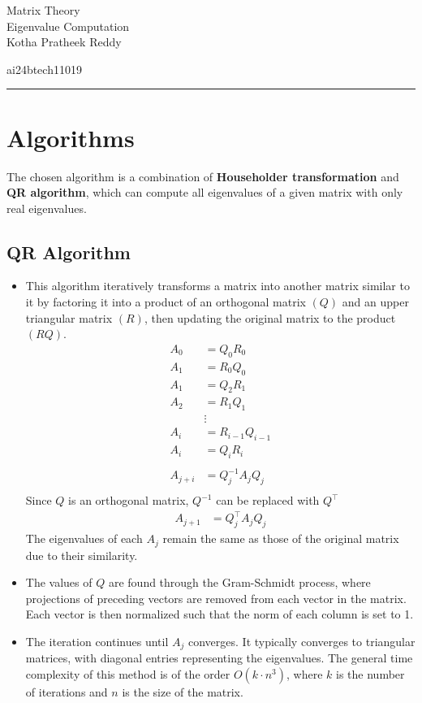 \documentclass[12pt,letterpaper, onecolumn]{exam}
\begin{document}
\begingroup  
    \centering
    \LARGE Matrix Theory\\
    \LARGE Eigenvalue Computation\\[0.5em]
    
    \large Kotha Pratheek Reddy\par
    \large ai24btech11019\par
    
\endgroup
\rule{\textwidth}{0.4pt}
\pointsdroppedatright   %
\printanswers
\renewcommand{\solutiontitle}{\noindent\textbf{Ans:}\enspace}   %

\section{Algorithms}
The chosen algorithm is a combination of \textbf{Householder transformation} and \textbf{QR algorithm}, which can compute all eigenvalues of a given matrix with only real eigenvalues.
\subsection{QR Algorithm}
\begin{itemize}
    \item This algorithm iteratively transforms a matrix into another matrix similar to it by factoring it into a product of an orthogonal matrix $(Q)$ and an upper triangular matrix $(R)$, then updating the original matrix to the product $(RQ)$.
    \begin{align*}
        A_0 &= Q_0R_0 \\
        A_1 &= R_0Q_0 \\
        A_1 &= Q_2R_1 \\
        A_2 &= R_1Q_1 \\
            &\vdots \\
        A_i &= R_{i-1}Q_{i-1} \\
        A_i &= Q_iR_i \\ \\
        A_{j+i} &= Q_j^{-1}A_jQ_j\\
    \end{align*}
    Since $Q$ is an orthogonal matrix, $Q^{-1}$ can be replaced with $Q^{\top}$
    \begin{align*}
        A_{j+1} &= Q_j ^{\top}A_jQ_j
    \end{align*}
    The eigenvalues of each $A_j$ remain the same as those of the original matrix due to their similarity.
    \item The values of $Q$ are found through the Gram-Schmidt process, where projections of preceding vectors are removed from each vector in the matrix. Each vector is then normalized such that the norm of each column is set to 1.
    \item The iteration continues until $A_j$ converges. It typically converges to triangular matrices, with diagonal entries representing the eigenvalues. The general time complexity of this method is of the order $O(k \cdot n^3)$, where $k$ is the number of iterations and $n$ is the size of the matrix.
\end{itemize}
\end{document}
